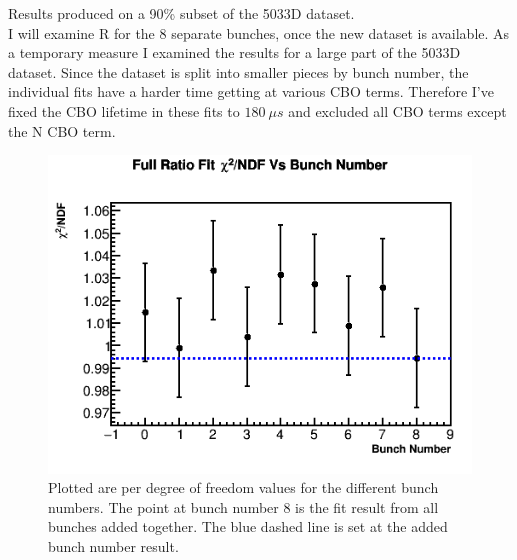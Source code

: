 		Results produced on a 90\% subset of the 5033D dataset. \\

		I will examine R for the 8 separate bunches, once the new dataset is available. As a temporary measure I examined the results for a large part of the 5033D dataset. Since the dataset is split into smaller pieces by bunch number, the individual fits have a harder time getting at various CBO terms. Therefore I've fixed the CBO lifetime in these fits to $\SI{180}{\mu s}$ and excluded all CBO terms except the N CBO term.

		\begin{figure}[]
			\centering
			\includegraphics[width=.6\textwidth]{RatioCBO_Chi2NDF_Vs_BunchNum_Canv}
		    \caption[BunchNumChi2]{Plotted are \chisq per degree of freedom values for the different bunch numbers. The point at bunch number 8 is the fit result from all bunches added together. The blue dashed line is set at the added bunch number result.}
		    \label{fig:BunchNumChi2}
		\end{figure}

